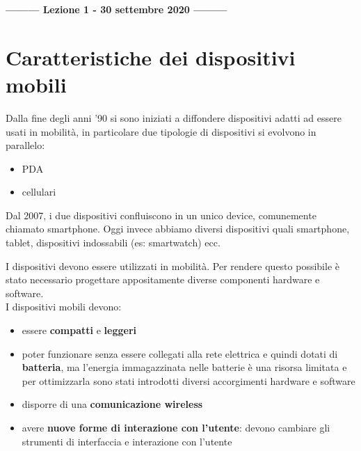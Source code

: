 \begin{center}
    \textbf{--------- Lezione 1 - 30 settembre 2020 ---------}
\end{center}

\section{Caratteristiche dei dispositivi mobili}
Dalla fine degli anni '90 si sono iniziati a diffondere dispositivi adatti ad essere usati in mobilità, in particolare due tipologie di dispositivi si evolvono in parallelo: 
\begin{itemize}
    \item PDA
    \item cellulari
\end{itemize}

Dal 2007, i due dispositivi confluiscono in un unico device, comunemente chiamato smartphone. Oggi invece abbiamo diversi dispositivi quali smartphone, tablet, dispositivi indossabili (es: smartwatch) ecc.

I dispositivi devono essere utilizzati in mobilità. Per rendere questo possibile è stato necessario progettare appositamente diverse componenti hardware e software.
\\ I dispositivi mobili devono:
\begin{itemize}
    \item essere \textbf{compatti} e \textbf{leggeri}
    \item poter funzionare senza essere collegati alla rete elettrica e quindi dotati di \textbf{batteria}, ma l'energia immagazzinata nelle batterie è una risorsa limitata e per ottimizzarla sono stati introdotti diversi accorgimenti hardware e software
    \item disporre di una \textbf{comunicazione wireless}
    \item avere \textbf{nuove forme di interazione con l'utente}: devono cambiare gli strumenti di interfaccia e interazione con l’utente
\end{itemize}

